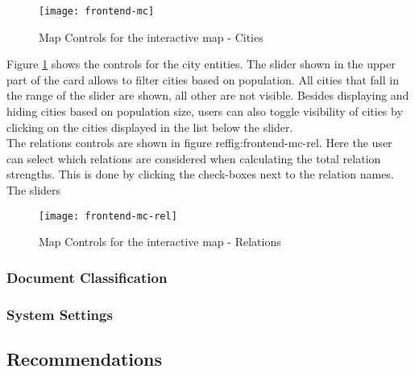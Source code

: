 \begin{figure}[h]
\centering
\texttt{[image: frontend-mc]}
\caption{Map Controls for the interactive map - Cities}
\label{fig:frontend-mc}
\end{figure}

Figure \ref{fig:frontend-mc} shows the controls for the city entities. The slider shown in the upper part of the card allows to filter cities based on population. All cities that fall in the range of the slider are shown, all other are not visible. Besides displaying and hiding cities based on population size, users can also toggle visibility of cities by clicking on the cities displayed in the list below the slider.\\
The relations controls are shown in figure ref{fig:frontend-mc-rel}. Here the user can select which relations are considered when calculating the total relation strengths. This is done by clicking the check-boxes next to the relation names. The sliders 

\begin{figure}[h]
\centering
\texttt{[image: frontend-mc-rel]}
\caption{Map Controls for the interactive map - Relations}
\label{fig:frontend-mc-rel}
\end{figure}

\subsubsection{Document Classification}
\subsubsection{System Settings}

\subsection{Recommendations}